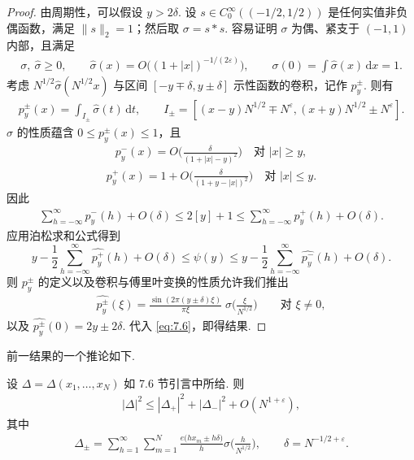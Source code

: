 \begin{proof}
由周期性，可以假设 $y > 2\delta$. 设 $s \in C_0^\infty((-1/2, 1/2))$ 是任何实值非负偶函数，满足 $\|s\|_2 = 1$；然后取 $\sigma = s * s$. 容易证明 $\sigma$ 为偶、紧支于 $(-1, 1)$ 内部，且满足
\begin{align*}
  \sigma,\ \widehat{\sigma}\geq 0,\qquad
  \widehat{\sigma}(x)=O\bigl((1+|x|)^{-1/(2\varepsilon)}\bigr),\qquad
  \sigma(0)=\int\widehat{\sigma}(x)\,\mathrm{d}x=1.
\end{align*}
考虑 $N^{1/2}\widehat{\sigma}(N^{1/2}x)$ 与区间 $[-y \mp \delta, y \pm \delta]$ 示性函数的卷积，记作 $p_y^\pm$. 则有
\begin{align*}
  p_{y}^{\pm}(x)=\int_{I_{\pm}}\widehat{\sigma}(t)\,\mathrm{d}t,\qquad
  I_{\pm}=[(x-y)N^{1/2}\mp N^{\varepsilon},(x+y)N^{1/2}\pm N^{\varepsilon}].
\end{align*}
$\widehat{\sigma}$ 的性质蕴含 $0 \leq p_{y}^{\pm}(x) \leq 1$，且
\begin{align*}
  p_{y}^{-}(x)=O\Big(\frac{\delta}{(1+|x|-y)^{2}}\Big)\quad\text{对 } |x|\geq y,
\end{align*}
\begin{align*}
  p_{y}^{+}(x)=1+O\Big(\frac{\delta}{(1+y-|x|)^{2}}\Big)\quad\text{对 } |x|\leq y.
\end{align*}
因此
\begin{align*}
  \sum_{h=-\infty}^{\infty}p_{y}^{-}(h)+O(\delta)\leq 2[y]+1
  \leq\sum_{h=-\infty}^{\infty}p_{y}^{+}(h)+O(\delta).
\end{align*}
应用泊松求和公式得到
\begin{equation}\label{eq:7.6}
  y-\frac{1}{2}\sum_{h=-\infty}^{\infty}\widehat{p_{y}^{+}}(h)+O(\delta)
  \leq\psi(y)\leq
  y-\frac{1}{2}\sum_{h=-\infty}^{\infty}\widehat{p_{y}^{-}}(h)+O(\delta).
\end{equation}
则 $p_{y}^{\pm}$ 的定义以及卷积与傅里叶变换的性质允许我们推出
\begin{align*}
  \widehat{p_{y}^{\pm}}(\xi)=\frac{\sin(2\pi(y\pm\delta)\xi)}{\pi\xi}\;\sigma\Big(\frac{\xi}{N^{1/2}}\Big)\qquad \text{对 } \xi\neq 0,
\end{align*}
以及 $\widehat{p_y^\pm}(0) = 2y \pm 2\delta$. 代入 \eqref{eq:7.6}，即得结果.
\end{proof}

前一结果的一个推论如下.

\begin{lemma}\label{lem:7.13}
设 $\Delta = \Delta(x_1, \ldots, x_N)$ 如 7.6 节引言中所给. 则
\begin{align*}
  |\Delta|^{2}\leq|\Delta_{+}|^{2}+|\Delta_{-}|^{2}+O(N^{1+\varepsilon}),
\end{align*}
其中
\begin{align*}
  \Delta_{\pm}=\sum_{h=1}^{\infty}\sum_{m=1}^{N}\frac{e\bigl(h x_{m}\pm h\delta\bigr)}{h}\sigma\Big(\frac{h}{N^{1/2}}\Big),\qquad
  \delta=N^{-1/2+\varepsilon}.
\end{align*}
\end{lemma}

